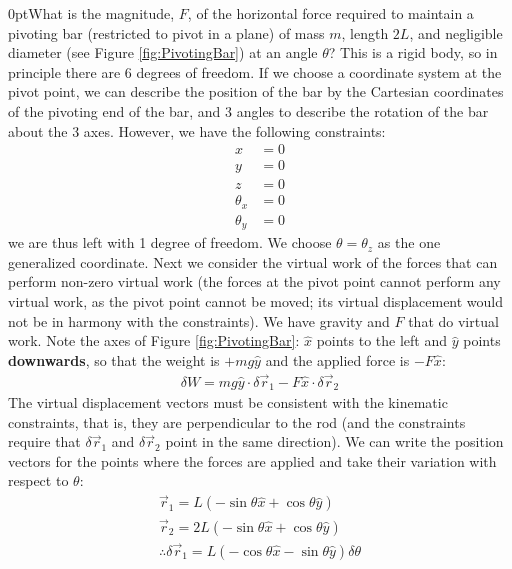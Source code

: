 \begin{example}{0pt}{What is the magnitude, $F$, of the horizontal force required to maintain a pivoting bar (restricted to pivot in a plane) of mass $m$, length $2L$, and negligible diameter (see Figure \ref{fig:PivotingBar}) at an angle $\theta$?}{}
This is a rigid body, so in principle there are 6 degrees of freedom. If we choose a coordinate system at the pivot point, we can describe the position of the bar by the Cartesian coordinates of the pivoting end of the bar, and 3 angles to describe the rotation of the bar about the 3 axes. However, we have the following constraints:
\begin{align*}
x&=0\nonumber\\
y&=0\nonumber\\
z&=0\nonumber\\
\theta_x &=0\nonumber\\
\theta_y &=0\nonumber
\end{align*}
we are thus left with 1 degree of freedom. We choose $\theta=\theta_z$ as the one generalized coordinate. Next we consider the virtual work of the forces that can perform non-zero virtual work (the forces at the pivot point cannot perform any virtual work, as the pivot point cannot be moved; its virtual displacement would not be in harmony with the constraints). We have gravity and $F$ that do virtual work. Note the axes of Figure \ref{fig:PivotingBar}: $\hat x$ points to the left and $\hat y$ points \textbf{downwards}, so that the weight is $+mg\hat y$ and the applied force is $-F\hat x$:
\begin{align*}
\delta W = mg\hat y\cdot\delta\vec{r}_1-F\hat x\cdot\delta\vec{r}_2
\end{align*}
The virtual displacement vectors must be consistent with the kinematic constraints, that is, they are perpendicular to the rod (and the constraints require that $\delta\vec{r}_1$ and $\delta\vec{r}_2$ point in the same direction). We can write the position vectors for the points where the forces are applied and take their variation with respect to $\theta$:
\begin{align*}
\vec{r}_1=L(-\sin{\theta}\hat{x}+\cos{\theta}\hat{y})\\
\vec{r}_2=2L(-\sin{\theta}\hat{x}+\cos{\theta}\hat{y})\\
\therefore \delta\vec{r}_1=L(-\cos{\theta}\hat{x}-\sin{\theta}\hat{y})\delta\theta\\

\end{align*}
\end{example}
